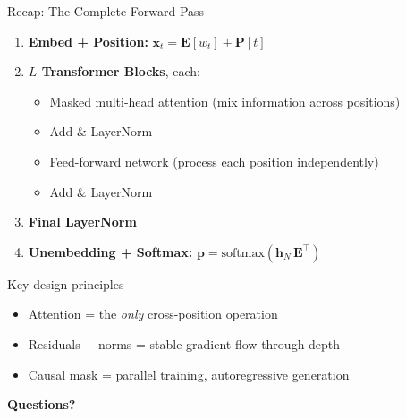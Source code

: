 \documentclass[aspectratio=169, professionalfonts]{beamer}
\begin{document}
\begin{frame}{Recap: The Complete Forward Pass}

\begin{enumerate}
  \item \textbf{Embed + Position:}
    $\mathbf{x}_t = \mathbf{E}[w_t] + \mathbf{P}[t]$
  \item \textbf{$L$ Transformer Blocks}, each:
    \begin{itemize}
      \item Masked multi-head attention (mix information across positions)
      \item Add \& LayerNorm
      \item Feed-forward network (process each position independently)
      \item Add \& LayerNorm
    \end{itemize}
  \item \textbf{Final LayerNorm}
  \item \textbf{Unembedding + Softmax:}
    $\mathbf{p} = \text{softmax}(\mathbf{h}_N\,\mathbf{E}^\top)$
\end{enumerate}

\bigskip

\begin{alertblock}{Key design principles}
\begin{itemize}
  \item Attention = the \emph{only} cross-position operation
  \item Residuals + norms = stable gradient flow through depth
  \item Causal mask = parallel training, autoregressive generation
\end{itemize}
\end{alertblock}

\end{frame}

{
\begin{frame}[c]
\centering
\Huge\textbf{Questions?}
\end{frame}
}
\end{document}
